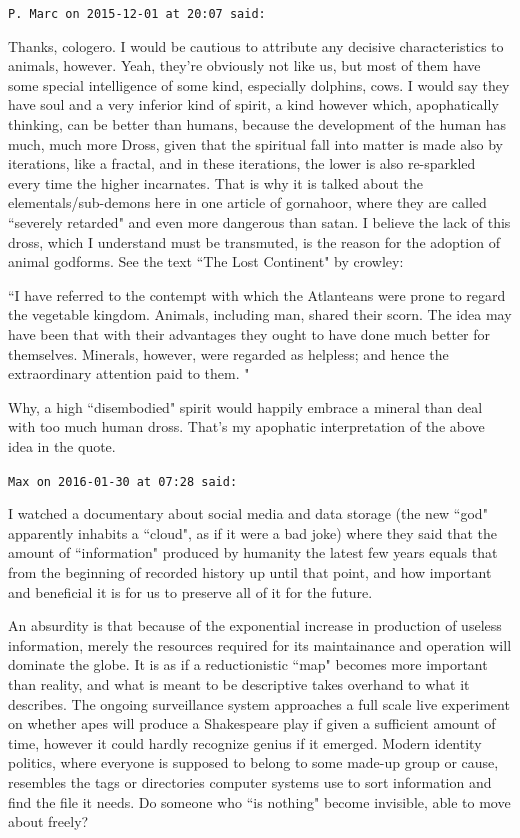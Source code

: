 \begin{footnotesize}
\begin{sffamily}
\hfill

\texttt{P. Marc on 2015-12-01 at 20:07 said: }

Thanks, cologero. I would be cautious to attribute any decisive characteristics to animals, however. Yeah,
they're obviously not like us, but most of them have some special intelligence of some kind,
especially dolphins, cows. I would say they have soul and a very inferior kind of spirit, a kind however which,
apophatically thinking, can be better than humans, because the development of the human has much, much more Dross,
given that the spiritual fall into matter is made also by iterations, like a fractal, and in these iterations, the
lower is also re-sparkled every time the higher incarnates. That is why it is talked about the elementals/sub-demons
here in one article of gornahoor, where they are called ``severely retarded" and even more dangerous than satan. I
believe the lack of this dross, which I understand must be transmuted, is the reason for the adoption of animal
godforms. See the text ``The Lost Continent" by crowley: 

``I have referred to the contempt with which the Atlanteans were prone to regard the vegetable kingdom. Animals,
including man, shared their scorn. The idea may have been that with their advantages they ought to have done much
better for themselves. Minerals, however, were regarded as helpless; and hence the extraordinary attention paid to
them. "

Why, a high ``disembodied" spirit would happily embrace a mineral than deal with too much human dross.
That's my apophatic interpretation of the above idea in the quote.


\hfill

\texttt{Max on 2016-01-30 at 07:28 said: }

I watched a documentary about social media and data storage (the new ``god" apparently inhabits a ``cloud", as if it were
a bad joke) where they said that the amount of ``information" produced by humanity the latest few years equals that from
the beginning of recorded history up until that point, and how important and beneficial it is for us to preserve all of
it for the future.

An absurdity is that because of the exponential increase in production of useless information, merely the resources
required for its maintainance and operation will dominate the globe. It is as if a reductionistic ``map" becomes more
important than reality, and what is meant to be descriptive takes overhand to what it describes. The ongoing
surveillance system approaches a full scale live experiment on whether apes will produce a Shakespeare play if given a
sufficient amount of time, however it could hardly recognize genius if it emerged. Modern identity politics, where
everyone is supposed to belong to some made-up group or cause, resembles the tags or directories computer systems use
to sort information and find the file it needs. Do someone who ``is nothing" become invisible, able to move about
freely?


\end{sffamily}
\end{footnotesize}
